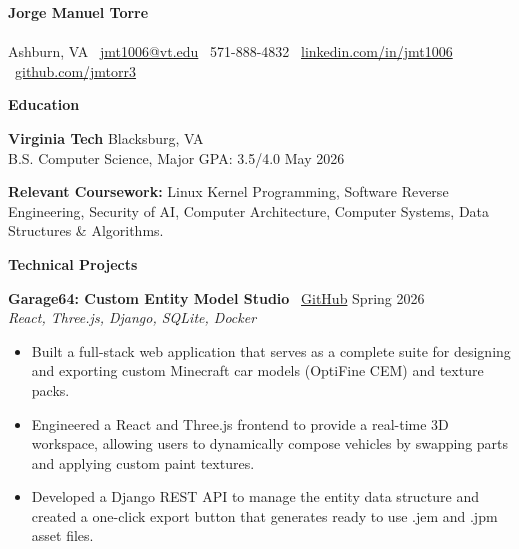 \documentclass[10pt]{article}
\begin{document}
\begin{center}
    \textbf{\Large Jorge Manuel Torre} \\
    \vspace{2pt}
    \hrulefill \\
    \vspace{2pt}
    Ashburn, VA \textbullet \ \href{mailto:jmt1006@vt.edu}{jmt1006@vt.edu} \textbullet \ 571-888-4832 \textbullet \ \href{https://www.linkedin.com/in/jmt1006/}{linkedin.com/in/jmt1006} \textbullet \ \href{https://github.com/jmtorr3}{github.com/jmtorr3}
\end{center}

\vspace{-5pt}

\begin{center}
    \textbf{\large Education}
\end{center}
\vspace{-5pt}

\textbf{Virginia Tech} \hfill Blacksburg, VA \\
B.S. Computer Science, Major GPA: 3.5/4.0 \hfill May 2026

\textbf{Relevant Coursework:} Linux Kernel Programming, Software Reverse Engineering, Security of AI, Computer Architecture, Computer Systems, Data Structures \& Algorithms.

\vspace{5pt}

\begin{center}
    \textbf{\large Technical Projects}
\end{center}
\vspace{-5pt}

\textbf{Garage64: Custom Entity Model Studio} \textbullet \ \href{https://github.com/jmtorr3/Garage64}{GitHub} \hfill Spring 2026 \\
\textit{React, Three.js, Django, SQLite, Docker}
\begin{itemize}[noitemsep, topsep=0pt, partopsep=0pt, parsep=0pt]
  \item Built a full-stack web application that serves as a complete suite for designing and exporting custom Minecraft car models (OptiFine CEM) and texture packs.
  \item Engineered a React and Three.js frontend to provide a real-time 3D workspace, allowing users to dynamically compose vehicles by swapping parts and applying custom paint textures.
  \item Developed a Django REST API to manage the entity data structure and created a one-click export button that generates ready to use .jem and .jpm asset files.
\end{itemize}
\end{document}
